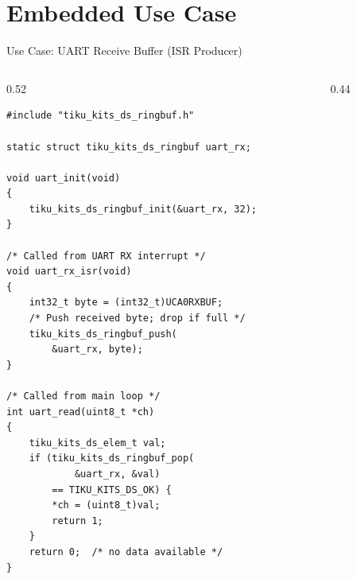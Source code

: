 \documentclass[aspectratio=169, 10pt]{beamer}
\begin{document}
\section{Embedded Use Case}

\begin{frame}[fragile]{Use Case: UART Receive Buffer (ISR Producer)}
\begin{columns}[T]
\begin{column}{0.52\textwidth}
\begin{lstlisting}[style=cstyle,
  title={ISR pushes, main loop pops}]
#include "tiku_kits_ds_ringbuf.h"

static struct tiku_kits_ds_ringbuf uart_rx;

void uart_init(void)
{
    tiku_kits_ds_ringbuf_init(&uart_rx, 32);
}

/* Called from UART RX interrupt */
void uart_rx_isr(void)
{
    int32_t byte = (int32_t)UCA0RXBUF;
    /* Push received byte; drop if full */
    tiku_kits_ds_ringbuf_push(
        &uart_rx, byte);
}

/* Called from main loop */
int uart_read(uint8_t *ch)
{
    tiku_kits_ds_elem_t val;
    if (tiku_kits_ds_ringbuf_pop(
            &uart_rx, &val)
        == TIKU_KITS_DS_OK) {
        *ch = (uint8_t)val;
        return 1;
    }
    return 0;  /* no data available */
}
\end{lstlisting}
\end{column}

\begin{column}{0.44\textwidth}
\begin{center}
\end{center}
\end{column}
\end{columns}
\end{frame}
\end{document}
